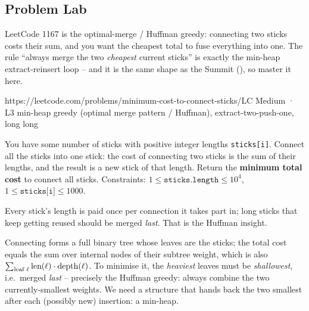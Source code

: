 \subsection{Problem Lab}

LeetCode 1167 is the optimal-merge / Huffman greedy: connecting two sticks costs their sum, and you want the
cheapest total to fuse everything into one. The rule ``always merge the two \emph{cheapest} current sticks''
is exactly the min-heap extract-reinsert loop -- and it is the same shape as the Summit (),
so master it here.

  {https://leetcode.com/problems/minimum-cost-to-connect-sticks/}{LC Medium · L3}
  {min-heap greedy (optimal merge pattern / Huffman), extract-two-push-one, long long}

\begin{problemstatement}
You have some number of sticks with positive integer lengths \texttt{sticks[i]}. Connect all the sticks into
one stick: the cost of connecting two sticks is the sum of their lengths, and the result is a new stick of
that length. Return the \textbf{minimum total cost} to connect all sticks. Constraints:
$1 \le \texttt{sticks.length} \le 10^{4}$, $1 \le \texttt{sticks[i]} \le 1000$.
\end{problemstatement}

\begin{attemptgate}
Every stick's length is paid once per connection it takes part in; long sticks that keep getting reused
should be merged \emph{last}. That is the Huffman insight.
\end{attemptgate}

Connecting forms a full binary tree whose leaves are the sticks; the total cost equals the sum over internal
nodes of their subtree weight, which is also $\sum_{\text{leaf } \ell} \text{len}(\ell)\cdot\operatorname{depth}(\ell)$. To
minimise it, the \emph{heaviest} leaves must be \emph{shallowest}, i.e.\ merged \emph{last} -- precisely the
Huffman greedy: always combine the two currently-smallest weights. We need a structure that hands back the
two smallest after each (possibly new) insertion: a min-heap.

